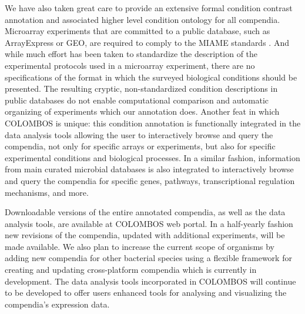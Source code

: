 We have also taken great care to provide an extensive formal condition contrast annotation and associated higher level condition ontology for all compendia. Microarray experiments that are committed to a public database, such as ArrayExpress or GEO, are required to comply to the MIAME standards \cite{Brazma2001, Brazma2009}. And while much effort has been taken to standardize the description of the experimental protocols used in a microarray experiment, there are no specifications of the format in which the surveyed biological conditions should be presented. The resulting cryptic, non-standardized condition descriptions in public databases do not enable computational comparison and automatic organizing of experiments which our annotation does. Another feat in which COLOMBOS is unique: this condition annotation is functionally integrated in the data analysis tools allowing the user to interactively browse and query the compendia, not only for specific arrays or experiments, but also for specific experimental conditions and biological processes. In a similar fashion, information from main curated microbial databases is also integrated to interactively browse and query the compendia for specific genes, pathways, transcriptional regulation mechanisms, and more. 

Downloadable versions of the entire annotated compendia, as well as the  data analysis tools, are available at COLOMBOS web portal\cite{COLOMBOS}.  In a half-yearly fashion new  revisions of the compendia, updated with additional experiments, will be made  available. We also plan to increase the current scope of organisms by adding  new compendia for other bacterial species using a flexible framework for  creating and updating cross-platform compendia which is currently in  development. The data analysis tools incorporated in COLOMBOS will continue to  be developed to offer users enhanced tools for analysing and visualizing the  compendia's expression data.







\cleardoublepage


